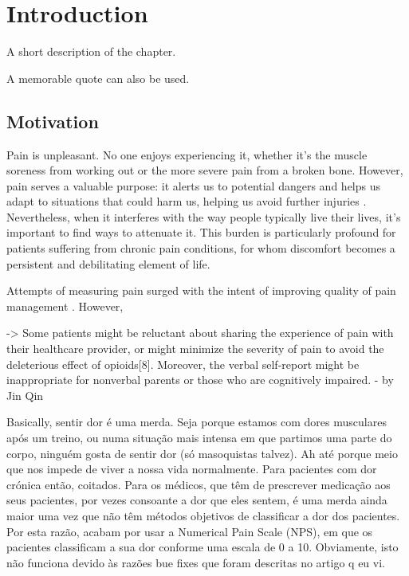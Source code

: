 \chapter{Introduction}%
\label{chapter:introduction}

\begin{introduction}
A short description of the chapter.

A memorable quote can also be used.
\end{introduction}


\section{Motivation}
Pain is unpleasant. No one enjoys experiencing it, whether it's the muscle soreness from working out or the more severe pain from a broken bone. However, pain serves a valuable purpose: it alerts us to potential dangers and helps us adapt to situations that could harm us, helping us avoid further injuries \cite{Coninx2021}. Nevertheless, when it interferes with the way people typically live their lives, it's important to find ways to attenuate it. This burden is particularly profound for patients suffering from chronic pain conditions, for whom discomfort becomes a persistent and debilitating element of life.

Attempts of measuring pain surged with the intent of improving quality of pain management \cite{Nugent2021}. However, 

-> Some patients might be reluctant about sharing the experience of pain with their healthcare provider, or might minimize the severity of pain to avoid the deleterious effect of opioids[8]. Moreover, the verbal self-report might be inappropriate for nonverbal parents or those who are cognitively impaired. - by Jin Qin


Basically, sentir dor é uma merda. Seja porque estamos com dores musculares após um treino, ou numa situação mais intensa em que partimos uma parte do corpo, ninguém gosta de sentir dor (só masoquistas talvez). Ah até porque meio que nos impede de viver a nossa vida normalmente. Para pacientes com dor crónica então, coitados. Para os médicos, que têm de prescrever medicação aos seus pacientes, por vezes consoante a dor que eles sentem, é uma merda ainda maior uma vez que não têm métodos objetivos de classificar a dor dos pacientes. Por esta razão, acabam por usar a Numerical Pain Scale (NPS), em que os pacientes classificam a sua dor conforme uma escala de 0 a 10. Obviamente, isto não funciona devido às razões bue fixes que foram descritas no artigo q eu vi.



